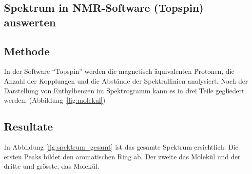 \documentclass[a4paper]{article}
\newenvironment{Figure}
	{\par\medskip\noindent\minipage{\linewidth}}
	{\endminipage\par\medskip}
\begin{document}
	\begin{multicols}{2}
		\section{Spektrum in NMR-Software (Topspin) auswerten}
		
			\subsection{Methode}
			In der Software ``Topspin'' werden die magnetisch äquivalenten
			Protonen, die Anzahl der Kopplungen und die Abstände der Spektrallinien analysiert.
			Nach der Darstellung von Enthylbenzen im Spektrogramm kann es in drei Teile gegliedert werden. 
			(Abbildung~\ref{fig:molekul})
			
			\begin{Figure}
				\centering
				\label{fig:molekul}
				\vspace*{0.5mm}
			\end{Figure}
		
			\subsection{Resultate}
				
				In Abbildung \ref{fig:spektrum_gesamt} ist das gesamte Spektrum ersichtlich.
				Die ersten Peaks bildet den aromatischen Ring ab. Der zweite das 
				Molekül und der dritte und grösste, das  Molekül.
				

\end{multicols}
\end{document}
